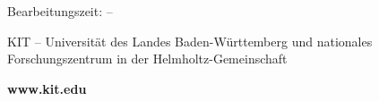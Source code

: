 \begin{titlepage}
\begin{adjustwidth}{-2.3cm}{0mm}
{\begin{minipage}[t]{\textwidth}
\begin{minipage}[t]{0.7\textwidth}
\begin{center}
   {\sf \large Bearbeitungszeit: \thesisbegin -- \thesisend}

  \end{center}
  \end{minipage}
  \vspace{4cm}

\end{minipage}
}

\vspace*{3mm}
\centering \begin{minipage}[t]{0.76\textwidth}
 {\scriptsize KIT -- Universit\"at des Landes Baden-W\"urttemberg und
 nationales Forschungszentrum in der Helmholtz-Gemeinschaft}
\end{minipage}
\begin{minipage}[t]{0.17\textwidth}
 \begin{flushright}
  {\bfseries www.kit.edu}
 \end{flushright}
\end{minipage}

\end{adjustwidth}
\end{titlepage}
\newpage
\thispagestyle{plain}
~
\newpage

